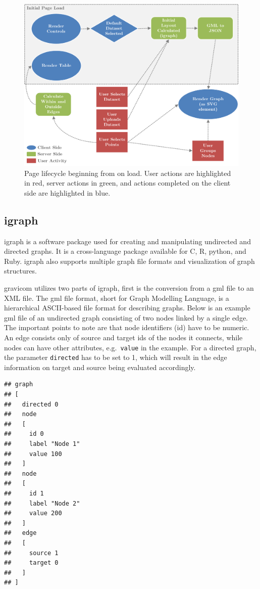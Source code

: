 \documentclass{article}\usepackage[]{graphicx}\usepackage[]{color}
\makeatletter
\newenvironment{kframe}{%
 \def\at@end@of@kframe{}%
 \ifinner\ifhmode%
  \def\at@end@of@kframe{\end{minipage}}%
  \begin{minipage}{\columnwidth}%
 \fi\fi%
 \def\FrameCommand##1{\hskip\@totalleftmargin \hskip-\fboxsep
 \colorbox{shadecolor}{##1}\hskip-\fboxsep
     \hskip-\linewidth \hskip-\@totalleftmargin \hskip\columnwidth}%
 \MakeFramed {\advance\hsize-\width
   \@totalleftmargin\z@ \linewidth\hsize
   \@setminipage}}%
 {\par\unskip\endMakeFramed%
 \at@end@of@kframe}
\newenvironment{knitrout}{}{} %
\makeatother
\begin{document}
\begin{figure}[H]
\centering
\includegraphics[width=\textwidth]{images/pagelifecycle.png}
\caption{\label{fig:pagelifecycle} Page lifecycle beginning from on load. User actions are highlighted in red, server actions in green, and actions completed on the client side are highlighted in blue.}
\end{figure}


\subsection{igraph}

igraph \cite{gc-igraph} is a software package used for creating and manipulating undirected and directed graphs. It is a cross-language package available for C, R, python, and Ruby. igraph also supports multiple graph file formats and visualization of graph structures.

gravicom utilizes two parts of igraph, first is the conversion from a gml file to an XML file. The gml file format, short for Graph Modelling Language, is a hierarchical ASCII-based file format for describing graphs. Below is an example gml file of an undirected graph consisting of two nodes linked by a single edge. The important points to note are that  node identifiers (id) have to be numeric. An edge consists only of source and target ids of the nodes it connects, while  nodes can have other attributes, e.g.~{\tt value} in the example. For a directed graph, the parameter {\tt directed} has to be set to 1, which will result in the edge information on target and source being evaluated accordingly.
\begin{knitrout}
\color{fgcolor}\begin{kframe}
\begin{verbatim}
## graph
## [
##   directed 0
##   node
##   [
##     id 0
##     label "Node 1"
##     value 100
##   ]
##   node
##   [
##     id 1
##     label "Node 2"
##     value 200
##   ]
##   edge
##   [
##     source 1
##     target 0
##   ]
## ]
\end{verbatim}
\end{kframe}
\end{knitrout}
\end{document}
